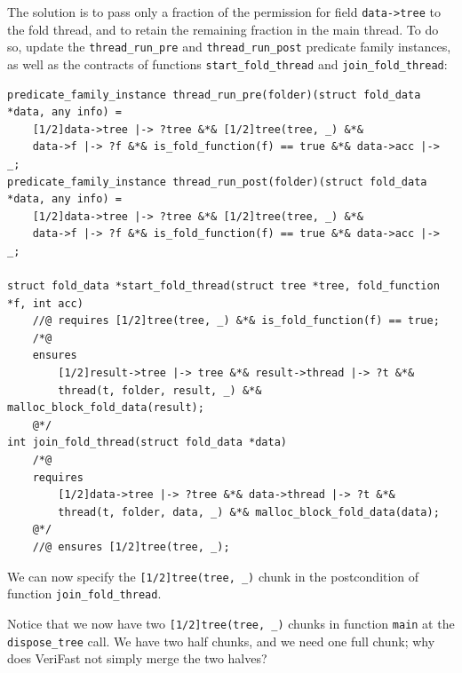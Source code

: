 \documentclass{article}
\begin{document}
The solution is to pass only a fraction of the permission for
field \lstinline|data->tree| to the fold thread, and to retain
the remaining fraction in the main thread. To do so, update the
\lstinline|thread_run_pre| and \lstinline|thread_run_post|
predicate family instances, as well as the contracts of
functions \lstinline|start_fold_thread| and
\lstinline|join_fold_thread|:
\begin{lstlisting}
predicate_family_instance thread_run_pre(folder)(struct fold_data *data, any info) =
    [1/2]data->tree |-> ?tree &*& [1/2]tree(tree, _) &*&
    data->f |-> ?f &*& is_fold_function(f) == true &*& data->acc |-> _;
predicate_family_instance thread_run_post(folder)(struct fold_data *data, any info) =
    [1/2]data->tree |-> ?tree &*& [1/2]tree(tree, _) &*&
    data->f |-> ?f &*& is_fold_function(f) == true &*& data->acc |-> _;

struct fold_data *start_fold_thread(struct tree *tree, fold_function *f, int acc)
    //@ requires [1/2]tree(tree, _) &*& is_fold_function(f) == true;
    /*@
    ensures
        [1/2]result->tree |-> tree &*& result->thread |-> ?t &*&
        thread(t, folder, result, _) &*& malloc_block_fold_data(result);
    @*/
int join_fold_thread(struct fold_data *data)
    /*@
    requires
        [1/2]data->tree |-> ?tree &*& data->thread |-> ?t &*&
        thread(t, folder, data, _) &*& malloc_block_fold_data(data);
    @*/
    //@ ensures [1/2]tree(tree, _);
\end{lstlisting}
We can now specify the \lstinline|[1/2]tree(tree, _)| chunk in
the postcondition of function \lstinline|join_fold_thread|.

Notice that we now have two \lstinline|[1/2]tree(tree, _)|
chunks in function \lstinline|main| at the
\lstinline|dispose_tree| call. We have two half chunks, and we
need one full chunk; why does VeriFast not simply merge the two
halves?
\end{document}
